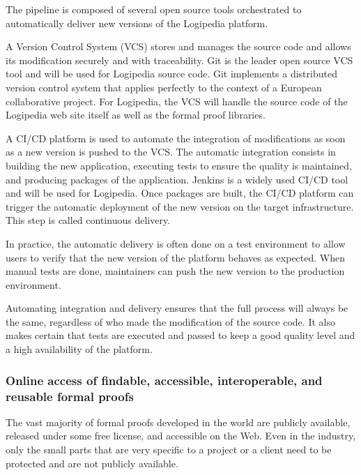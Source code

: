 The pipeline is composed of several open source tools orchestrated
to automatically deliver new versions of the Logipedia platform.

\begin{compactitem}
\item
A Version Control System (VCS) stores and manages the source code and
allows its modification securely and with traceability. Git is the leader
open source VCS tool and will be used for Logipedia source code. Git implements
a distributed version control system that applies perfectly to the context of
a European collaborative project. For Logipedia, the VCS will handle the
source code of the Logipedia web site itself as well as the formal proof libraries.
\item
A CI/CD platform is used to automate the integration of modifications
as soon as a new version is pushed to the VCS. The automatic integration
consists in building the new application, executing tests to ensure
the quality is maintained, and producing packages of the application.
Jenkins is a widely used CI/CD tool and will be used for Logipedia.
Once packages are built, the CI/CD platform can trigger the automatic
deployment of the new version on the target infrastructure.
This step is called continuous delivery.
\end{compactitem}

In practice, the automatic delivery is often done on a test environment
to allow users to verify that the new version of the platform
behaves as expected. When manual tests are done, maintainers can push
the new version to the production environment.

Automating integration and delivery ensures that the full process
will always be the same, regardless of who made the modification
of the source code. It also makes certain that tests are executed and passed
to keep a good quality level and a high availability of the platform.

\subsubsection*{Online access of findable, accessible, interoperable, and
reusable formal proofs}

The vast majority of formal proofs developed in the world are publicly
available, released under some free license, and accessible on the
Web. Even in the industry, only the small parts that are very specific
to a project or a client need to be protected and are not publicly
available.

